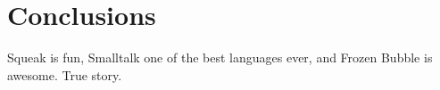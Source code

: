 \section{Conclusions}
Squeak is fun, Smalltalk one of the best languages ever, and Frozen Bubble is awesome. True story.